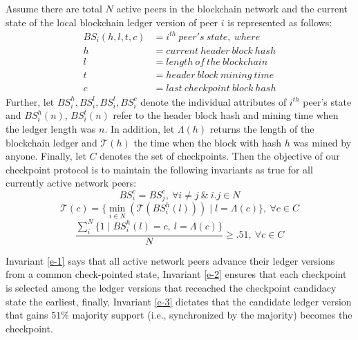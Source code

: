 \documentclass[conference]{IEEEtran}
\begin{document}
Assume there are total $N$ active peers in the blockchain network and the current state of the local blockchain ledger version of peer $i$ is represented as follows:
\begin{equation*}
\begin{split}
	BS_i(h, l, t, c) & = i^{th}\ peer's\ state,\ where \\
	h & = current\ header\ block\ hash \\
	l & = length\ of\ the\ blockchain \\
	t & = header\ block\ mining\ time \\
	c & = last\ checkpoint\ block\ hash	 
\end{split}
\end{equation*}
Further, let $BS_i^h, BS_i^l, BS_i^t, BS_i^c$ denote the individual attributes of $i^{th}$ peer's state and $BS_i^h(n)$, $BS_i^t(n)$ refer to the header block hash and mining time when the ledger length was $n$. In addition, let $\Lambda(h)$ returns the length of the blockchain ledger and $\mathcal{T}(h)$ the time when the block with hash $h$ was mined by anyone. Finally, let $C$ denotes the set of checkpoints. Then the objective of our checkpoint protocol is to maintain the following invariants as true for all currently active network peers:
\begin{equation}
\label{e-1}
BS_i^c = BS_j^c,\ \forall i \neq j\ \&\ i.j \in N
\end{equation}
\begin{equation}
\label{e-2}
\mathcal{T}(c) = \{\min_{i \in N}(\mathcal{T}(BS_i^h(l))) \mid l = \Lambda(c)\},\ \forall c \in C  
\end{equation}
\begin{equation}
\label{e-3}
\frac{\sum_i^N{\{1 \mid BS_i^h(l) = c,\ l = \Lambda(c)}\}}{N} \geq .51,\ \forall c \in C  
\end{equation}

Invariant \ref{e-1} says that all active network peers advance their ledger versions from a common check-pointed state, Invariant \ref{e-2} ensures that each checkpoint is selected among the ledger versions that receached the checkpoint candidacy state the earliest, finally, Invariant \ref{e-3} dictates that the candidate ledger version that gains $51\%$ majority support (i.e., synchronized by the majority) becomes the checkpoint.
\end{document}
